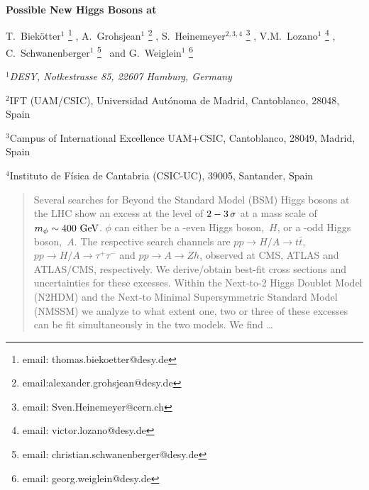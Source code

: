 \documentclass[12pt]{article}
\begin{document}
\thispagestyle{empty}


\def\thefootnote{\fnsymbol{footnote}}

\begin{flushright}
\mbox{}
\end{flushright}

\vspace{0.5cm}

\begin{center}

{\large\sc
{\bf Possible New Higgs Bosons at \boldmath{$\sim 400 \gev$}
}}

\vspace{1cm}


{\sc
T.~Biek\"otter$^{1}$%
\footnote{email: thomas.biekoetter@desy.de}%
, A.~Grohsjean$^1$%
\footnote{email:alexander.grohsjean@desy.de}%
, S.~Heinemeyer$^{2,3,4}$%
\footnote{email: Sven.Heinemeyer@cern.ch}%
, V.M.~Lozano$^1$%
\footnote{email: victor.lozano@desy.de}%
,\\[.5em] C.~Schwanenberger$^1$%
\footnote{email: christian.schwanenberger@desy.de}%
~and G.~Weiglein$^{1}$%
\footnote{email: georg.weiglein@desy.de}%
}

\vspace*{.7cm}

{\sl
$^1$DESY, Notkestrasse 85, 22607 Hamburg, Germany

\vspace*{0.1cm}

$^2$IFT (UAM/CSIC), Universidad Aut\'onoma de Madrid, 
Cantoblanco, 28048, Spain

\vspace{0.1cm}

$^3$Campus of International Excellence UAM+CSIC, 
Cantoblanco, 28049, Madrid, Spain 

\vspace*{0.1cm}

$^4$Instituto de F\'isica de Cantabria (CSIC-UC), 
39005, Santander, Spain
}

\end{center}

\vspace*{0.1cm}

\begin{abstract}
\noindent
Several searches for Beyond the Standard Model (BSM) Higgs bosons at the
LHC show an excess at the level of $2-3\,\sigma$ at a mass scale of
$m_\phi \sim 400 \,\, \mathrm{GeV}$. $\phi$ can either be a \cp-even Higgs boson,~$H$,
or a \cp-odd Higgs boson,~$A$. The respective search channels are
$pp \to H/A \to t \bar t$, $pp \to H/A \to \tau^+\tau^-$ and
$pp \to A \to Z h$, observed at CMS, ATLAS and ATLAS/CMS, respectively.
We derive/obtain best-fit cross sections and uncertainties for these excesses. 
Within the Next-to-2 Higgs Doublet Model (N2HDM) and the Next-to Minimal
Supersymmetric Standard Model (NMSSM) we analyze to what extent one, two
or three of these excesses can be fit simultaneously in the two models.
We find \ldots
\end{abstract}
\end{document}
